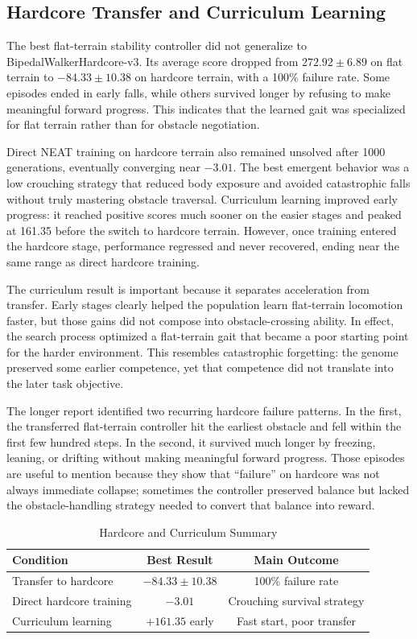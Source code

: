 \documentclass[journal]{IEEEtran}
\begin{document}
\subsection{Hardcore Transfer and Curriculum Learning}
The best flat-terrain stability controller did not generalize to BipedalWalkerHardcore-v3. Its average score dropped from $272.92 \pm 6.89$ on flat terrain to $-84.33 \pm 10.38$ on hardcore terrain, with a 100\% failure rate. Some episodes ended in early falls, while others survived longer by refusing to make meaningful forward progress. This indicates that the learned gait was specialized for flat terrain rather than for obstacle negotiation.

Direct NEAT training on hardcore terrain also remained unsolved after 1000 generations, eventually converging near $-3.01$. The best emergent behavior was a low crouching strategy that reduced body exposure and avoided catastrophic falls without truly mastering obstacle traversal. Curriculum learning improved early progress: it reached positive scores much sooner on the easier stages and peaked at 161.35 before the switch to hardcore terrain. However, once training entered the hardcore stage, performance regressed and never recovered, ending near the same range as direct hardcore training.

The curriculum result is important because it separates acceleration from transfer. Early stages clearly helped the population learn flat-terrain locomotion faster, but those gains did not compose into obstacle-crossing ability. In effect, the search process optimized a flat-terrain gait that became a poor starting point for the harder environment. This resembles catastrophic forgetting: the genome preserved some earlier competence, yet that competence did not translate into the later task objective.

The longer report identified two recurring hardcore failure patterns. In the first, the transferred flat-terrain controller hit the earliest obstacle and fell within the first few hundred steps. In the second, it survived much longer by freezing, leaning, or drifting without making meaningful forward progress. Those episodes are useful to mention because they show that ``failure'' on hardcore was not always immediate collapse; sometimes the controller preserved balance but lacked the obstacle-handling strategy needed to convert that balance into reward.

\begin{table}[t]
\caption{Hardcore and Curriculum Summary}
\label{tab:hardcore}
\centering
\begin{tabular}{lcc}
\toprule
\textbf{Condition} & \textbf{Best Result} & \textbf{Main Outcome} \\
\midrule
Transfer to hardcore & $-84.33 \pm 10.38$ & 100\% failure rate \\
Direct hardcore training & $-3.01$ & Crouching survival strategy \\
Curriculum learning & $+161.35$ early & Fast start, poor transfer \\
\bottomrule
\end{tabular}
\end{table}
\end{document}
